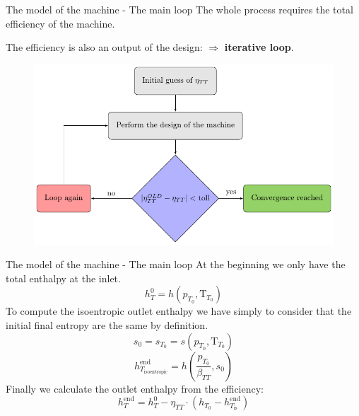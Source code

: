 \documentclass{beamer}
\begin{document}
\begin{frame}[t]{The model of the machine - The main loop}
The whole process requires the total efficiency of the machine. 

The efficiency is also an output of the design: $\Rightarrow$ \textbf{iterative loop}.

\begin{figure}[hbtp]
\centering
\includegraphics[scale=0.7]{fig/mainloop_fig.pdf}
\end{figure}

\end{frame}



\begin{frame}[t]{The model of the machine - The main loop}
At the beginning we only have the total enthalpy at the inlet.
\begin{equation}
h_T^{0} = h(p_{T_{0}}, \text{T}_{T_{0}})
\end{equation}
To compute the isoentropic outlet enthalpy we have simply to consider that 
the initial final entropy are the same by definition.
\begin{equation}
s_0 = s_{T_{0}} = s(p_{T_{0}}, \text{T}_{T_{0}})
\end{equation}
\begin{equation}
h_{T_\text{isoentropic}}^{\text{end}} = h\left(\dfrac{p_{T_{0}}}{\beta_{TT}}, s_{0}\right)
\end{equation}
Finally we calculate the outlet enthalpy from the efficiency:
\begin{equation}
h_{T}^{\text{end}} = h_T^{0} - \eta_{TT} \cdot (h_{T_{0}} - h_{T_\text{is}}^{\text{end}})
\end{equation}
\end{frame}
\end{document}

